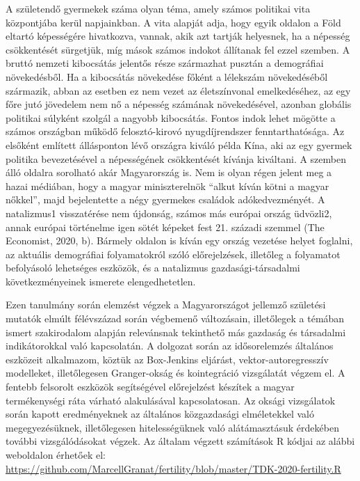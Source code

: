 \documentclass[
]{article}
\begin{document}
A születendő gyermekek száma olyan téma, amely számos politikai vita
központjába kerül napjainkban. A vita alapját adja, hogy egyik oldalon a
Föld eltartó képességére hivatkozva, vannak, akik azt tartják helyesnek,
ha a népesség csökkentését sürgetjük, míg mások számos indokot állítanak
fel ezzel szemben. A bruttó nemzeti kibocsátás jelentős része származhat
pusztán a demográfiai növekedésből. Ha a kibocsátás növekedése főként a
lélekszám növekedéséből származik, abban az esetben ez nem vezet az
életszínvonal emelkedéséhez, az egy főre jutó jövedelem nem nő a
népesség számának növekedésével, azonban globális politikai súlyként
szolgál a nagyobb kibocsátás. Fontos indok lehet mögötte a számos
országban működő felosztó-kirovó nyugdíjrendszer fenntarthatósága. Az
elsőként említett állásponton lévő országra kiváló példa Kína, aki az
egy gyermek politika bevezetésével a népességének csökkentését kívánja
kiváltani. A szemben álló oldalra sorolható akár Magyarország is. Nem is
olyan régen jelent meg a hazai médiában, hogy a magyar miniszterelnök
``alkut kíván kötni a magyar nőkkel'', majd bejelentette a négy
gyermekes családok adókedvezményét. A natalizmus1 visszatérése nem
újdonság, számos más európai ország üdvözli2, annak európai történelme
igen sötét képeket fest 21. századi szemmel (The Economist, 2020, b).
Bármely oldalon is kíván egy ország vezetése helyet foglalni, az
aktuális demográfiai folyamatokról szóló előrejelzések, illetőleg a
folyamatot befolyásoló lehetséges eszközök, és a natalizmus
gazdasági-társadalmi következményeinek ismerete elengedhetetlen.

Ezen tanulmány során elemzést végzek a Magyarországot jellemző születési
mutatók elmúlt félévszázad során végbemenő változásain, illetőlegek a
témában ismert szakirodalom alapján relevánsnak tekinthető más gazdaság
és társadalmi indikátorokkal való kapcsolatán. A dolgozat során az
idősorelemzés általános eszközeit alkalmazom, köztük az Box-Jenkins
eljárást, vektor-autoregresszív modelleket, illetőlegesen Granger-okság
és kointegráció vizsgálatát végzem el. A fentebb felsorolt eszközök
segítségével előrejelzést készítek a magyar termékenységi ráta várható
alakulásával kapcsolatosan. Az oksági vizsgálatok során kapott
eredményeknek az általános közgazdasági elméletekkel való
megegyezésüknek, illetőlegesen hitelességüknek való alátámasztásuk
érdekében további vizsgálódásokat végzek. Az általam végzett számítások
R kódjai az alábbi weboldalon érhetőek el:
\url{https://github.com/MarcellGranat/fertility/blob/master/TDK-2020-fertility.R}
\end{document}
